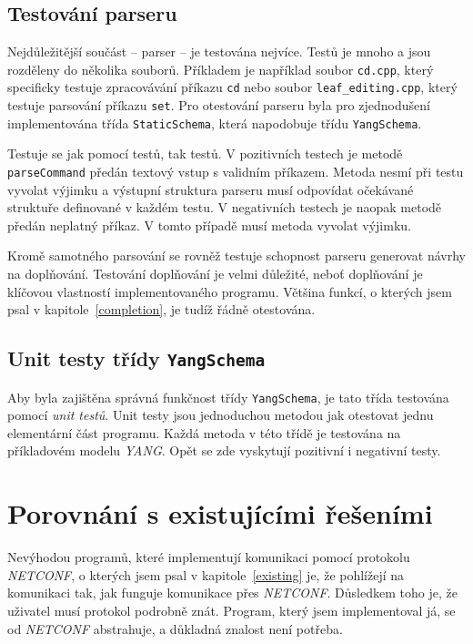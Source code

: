 \documentclass[thesis=B,czech,hidelinks]{FITthesis}[2019/03/06]
\begin{document}
\subsection{Testování parseru}
Nejdůležitější součást -- parser -- je testována nejvíce. Testů je mnoho a jsou rozděleny do několika souborů. Příkladem je například soubor \texttt{cd.cpp}, který specificky testuje zpracovávání příkazu \texttt{cd} nebo soubor \texttt{leaf\_editing.cpp}, který testuje parsování příkazu \texttt{set}. Pro otestování parseru byla pro zjednodušení implementována třída \texttt{StaticSchema}, která napodobuje třídu \texttt{YangSchema}.

Testuje se jak pomocí  testů, tak  testů. V pozitivních testech je metodě \texttt{parseCommand} předán textový vstup s validním příkazem. Metoda nesmí při testu vyvolat výjimku a výstupní struktura parseru musí odpovídat očekávané struktuře definované v každém testu. V negativních testech je naopak metodě předán neplatný příkaz. V tomto případě musí metoda vyvolat výjimku.

Kromě samotného parsování se rovněž testuje schopnost parseru generovat návrhy na doplňování. Testování doplňování je velmi důležité, neboť doplňování je klíčovou vlastností implementovaného programu. Většina funkcí, o kterých jsem psal v kapitole~\ref{completion}, je tudíž řádně otestována.

\subsection{Unit testy třídy \texttt{YangSchema}}
Aby byla zajištěna správná funkčnost třídy \texttt{YangSchema}, je tato třída testována pomocí \textit{unit testů}. Unit testy jsou jednoduchou metodou jak otestovat jednu elementární část programu. Každá metoda v této třídě je testována na příkladovém modelu \textit{YANG}. Opět se zde vyskytují pozitivní i negativní testy.


\section{Porovnání s existujícími řešeními}
Nevýhodou programů, které implementují komunikaci pomocí protokolu \textit{NETCONF}, o kterých jsem psal v kapitole~\ref{existing} je, že pohlížejí na komunikaci tak, jak funguje komunikace přes \textit{NETCONF}. Důsledkem toho je, že uživatel musí protokol podrobně znát. Program, který jsem implementoval já, se od \textit{NETCONF} abstrahuje, a důkladná znalost není potřeba.
\end{document}
